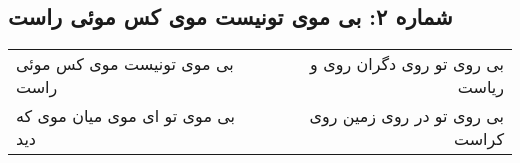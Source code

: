 \begin{center}
\section*{شماره ۲: بی موی تونیست موی کس موئی راست}
\label{sec:002}
\begin{longtable}{l p{0.5cm} r}
بی موی تونیست موی کس موئی راست
&&
بی روی تو روی دگران روی و ریاست
\\
بی موی تو ای موی میان موی که دید
&&
بی روی تو در روی زمین روی کراست
\\
\end{longtable}
\end{center}
